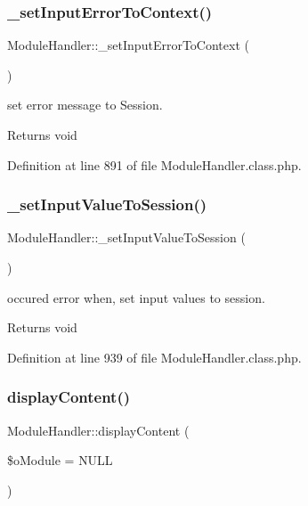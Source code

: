 \subsubsection{\texorpdfstring{\+\_\+set\+Input\+Error\+To\+Context()}{\_setInputErrorToContext()}}
{\footnotesize\ttfamily Module\+Handler\+::\+\_\+set\+Input\+Error\+To\+Context (\begin{DoxyParamCaption}{ }\end{DoxyParamCaption})}

set error message to Session. \begin{DoxyReturn}{Returns}
void 
\end{DoxyReturn}


Definition at line 891 of file Module\+Handler.\+class.\+php.

\mbox{\label{classModuleHandler_ab3837506079a320e2726079777bb2b3e}} 
\subsubsection{\texorpdfstring{\+\_\+set\+Input\+Value\+To\+Session()}{\_setInputValueToSession()}}
{\footnotesize\ttfamily Module\+Handler\+::\+\_\+set\+Input\+Value\+To\+Session (\begin{DoxyParamCaption}{ }\end{DoxyParamCaption})}

occured error when, set input values to session. \begin{DoxyReturn}{Returns}
void 
\end{DoxyReturn}


Definition at line 939 of file Module\+Handler.\+class.\+php.

\mbox{\label{classModuleHandler_a140c43faf30dedf139212294e3e9acf3}} 
\subsubsection{\texorpdfstring{display\+Content()}{displayContent()}}
{\footnotesize\ttfamily Module\+Handler\+::display\+Content (\begin{DoxyParamCaption}\item[{}]{\$o\+Module = {\ttfamily NULL} }\end{DoxyParamCaption})}

